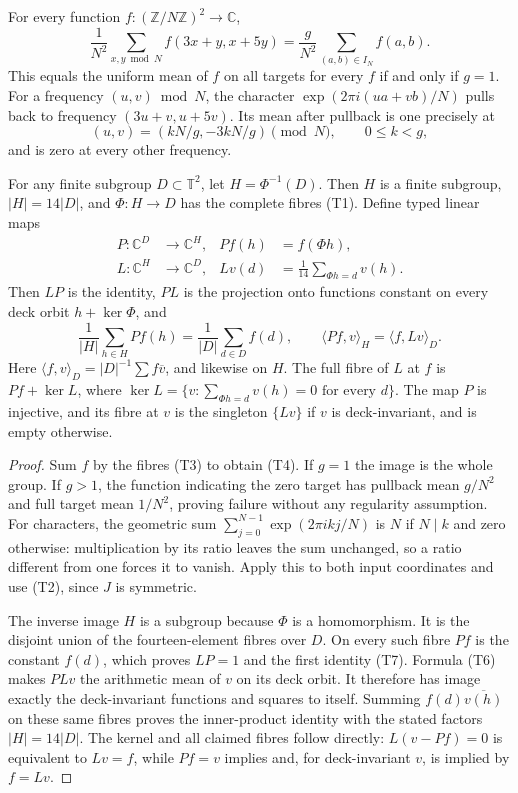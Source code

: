 \begin{theorem}
\label{thm:ns-torus-average}
For every function $f:(\mathbb Z/N\mathbb Z)^2\to\mathbb C$,
\[
 \frac1{N^2}\sum_{x,y\bmod N} f(3x+y,x+5y)
   =\frac g{N^2}\sum_{(a,b)\in I_N}f(a,b).             \tag{T4}
\]
This equals the uniform mean of $f$ on all targets for every $f$ if
and only if $g=1$. For a frequency $(u,v)\bmod N$, the character
$\exp(2\pi i(ua+vb)/N)$ pulls back to frequency
$(3u+v,u+5v)$. Its mean after pullback is one precisely at
\[
 (u,v)=(kN/g,-3kN/g)\pmod N,\qquad 0\leq k<g,          \tag{T5}
\]
and is zero at every other frequency.

For any finite subgroup $D\subset\mathbb T^2$, let
$H=\Phi^{-1}(D)$. Then $H$ is a finite subgroup,
$|H|=14|D|$, and $\Phi:H\to D$ has the complete fibres (T1).
Define typed linear maps
\[
 \begin{aligned}
 P:\mathbb C^D&\longrightarrow\mathbb C^H,& Pf(h)&=f(\Phi h),\\
 L:\mathbb C^H&\longrightarrow\mathbb C^D,& Lv(d)&=
       \frac1{14}\sum_{\Phi h=d}v(h).
 \end{aligned}                                                   \tag{T6}
\]
Then $LP$ is the identity, $PL$ is the projection onto functions
constant on every deck orbit $h+\ker\Phi$, and
\[
 \frac1{|H|}\sum_{h\in H}Pf(h)=\frac1{|D|}\sum_{d\in D}f(d),
 \qquad
 \langle Pf,v\rangle_H=\langle f,Lv\rangle_D.          \tag{T7}
\]
Here $\langle f,v\rangle_D=|D|^{-1}\sum f\overline v$,
and likewise on $H$. The full fibre of $L$ at $f$ is
$Pf+\ker L$, where
$\ker L=\{v:\sum_{\Phi h=d}v(h)=0\text{ for every }d\}$.
The map $P$ is injective, and its fibre at $v$ is the singleton
$\{Lv\}$ if $v$ is deck-invariant, and is empty otherwise.
\end{theorem}
\begin{proof}
Sum $f$ by the fibres (T3) to obtain (T4). If $g=1$ the image is the
whole group. If $g>1$, the function indicating the zero target has
pullback mean $g/N^2$ and full target mean $1/N^2$, proving failure
without any regularity assumption. For characters, the geometric
sum $\sum_{j=0}^{N-1}\exp(2\pi i kj/N)$ is $N$ if $N\mid k$
and zero otherwise: multiplication by its ratio leaves the sum
unchanged, so a ratio different from one forces it to vanish. Apply this to
both input coordinates and use (T2), since $J$ is symmetric.

The inverse image $H$ is a subgroup because $\Phi$ is a homomorphism.
It is the disjoint union of the fourteen-element fibres over $D$.
On every such fibre $Pf$ is the constant $f(d)$, which proves
$LP=1$ and the first identity (T7). Formula (T6) makes $PLv$ the
arithmetic mean of $v$ on its deck orbit. It therefore has image
exactly the deck-invariant functions and squares to itself.
Summing $f(d)\overline{v(h)}$ on these same fibres proves the
inner-product identity with the stated factors $|H|=14|D|$.
The kernel and all claimed fibres follow directly: $L(v-Pf)=0$
is equivalent to $Lv=f$, while $Pf=v$ implies and, for
deck-invariant $v$, is implied by $f=Lv$.
\end{proof}

